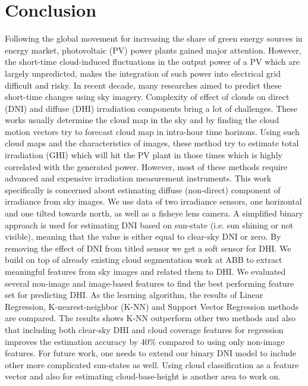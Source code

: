 \chapter{Conclusion}
Following the global movement for increasing the share of green energy sources in energy market, photovoltaic (PV) power plants gained major attention. However, the short-time cloud-induced fluctuations in the output power of a PV which are largely unpredicted, makes the integration of such power into electrical grid difficult and risky. In recent decade, many researches aimed to predict these short-time changes using sky imagery. Complexity of effect of clouds on direct (DNI) and diffuse (DHI) irradiation components bring a lot of challenges. These works usually determine the cloud map in the sky and by finding the cloud motion vectors try to forecast cloud map in intra-hour time horizons. Using such cloud maps and the characteristics of images, these method try to estimate total irradiation (GHI) which will hit the PV plant in those times which is highly correlated with the generated power. However, most of these methods require advanced and expensive irradiation measurement instruments.
\newline
This work specifically is concerned about estimating diffuse (non-direct) component of irradiance from sky images. We use data of two irradiance sensors, one horizontal and one tilted towards north, as well as a fisheye lens camera. A simplified binary approach is used for estimating DNI based on sun-state (i.e. sun shining or not visible), meaning that the value is either equal to clear-sky DNI or zero. By removing the effect of DNI from titled sensor we get a soft sensor for DHI. We build on top of already existing cloud segmentation work at ABB to extract meaningful features from sky images and related them to DHI. We evaluated several non-image and image-based features to find the best performing feature set for predicting DHI. As the learning algorithm, the results of Linear Regression, K-nearest-neighbor (K-NN) and Support Vector Regression methods are compared. The results shows K-NN outperform other two methods and also that including both clear-sky DHI and cloud coverage features for regression improves the estimation accuracy by 40\% compared to using only non-image features. 
\newline
For future work, one needs to extend our binary DNI model to include other more complicated sun-states as well. Using cloud classification as a feature vector and also for estimating cloud-base-height is another area to work on.